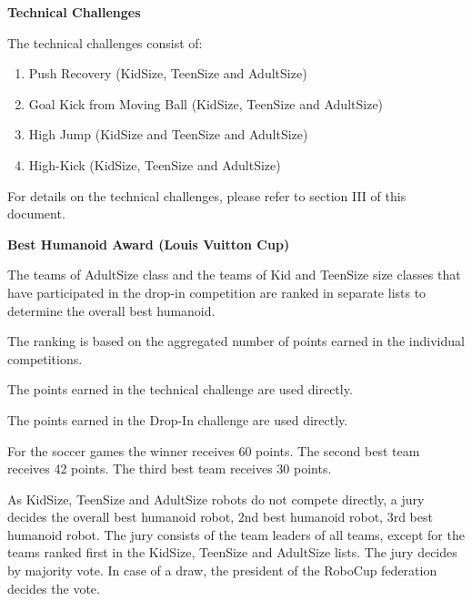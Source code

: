 {\bfseries Technical Challenges}

\headlinebox

The technical challenges consist of:

\begin{enumerate}
\item Push Recovery (KidSize, TeenSize and AdultSize)
\item Goal Kick from Moving Ball (KidSize, TeenSize and AdultSize)
\item High Jump (KidSize and TeenSize and AdultSize)
\item High-Kick (KidSize, TeenSize and AdultSize)
\end{enumerate}

For details on the technical challenges, please refer to section III of this document.

\bigskip

{\bfseries Best Humanoid Award (Louis Vuitton Cup)}

\headlinebox
 
The teams of AdultSize class and the teams of Kid and TeenSize size classes that have participated in the drop-in competition are ranked in separate lists to determine the overall best humanoid.

The ranking is based on the aggregated number of points earned in the individual competitions.

\bigskip

The points earned in the technical challenge are used directly.

\bigskip

The points earned in the Drop-In challenge are used directly.

\bigskip

For the soccer games the winner receives 60 points. The second best team receives 42 points. The third best team receives 30 points.

\bigskip

As KidSize, TeenSize and AdultSize robots do not compete directly, a jury decides the overall best humanoid robot, 2nd best humanoid robot, 3rd best humanoid robot. The jury consists of the team leaders of all teams, except for the teams ranked first in the KidSize, TeenSize and AdultSize lists. The jury decides by majority vote. In case of a draw, the president of the RoboCup federation decides the vote.

